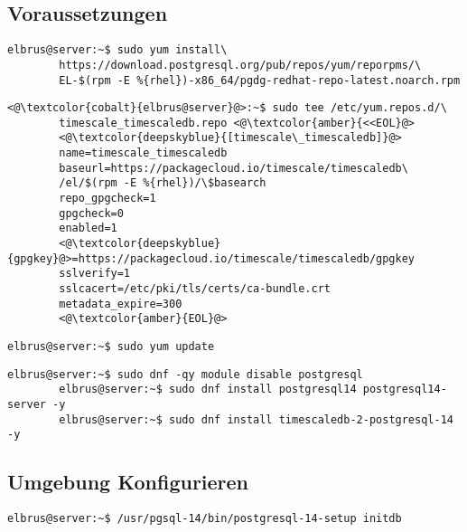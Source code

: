 \documentclass{article}
\begin{document}
	\subsection[dependencies]{Voraussetzungen}
	\lstset{style=commands}
	\begin{lstlisting}[caption={Hinzufügen des PostgreSQL Drittanbieter-Repository, um die neuesten PostgreSQL-Pakete zu erhalten.}]
		elbrus@server:~$ sudo yum install\
		https://download.postgresql.org/pub/repos/yum/reporpms/\
		EL-$(rpm -E %{rhel})-x86_64/pgdg-redhat-repo-latest.noarch.rpm
	\end{lstlisting}

	\lstset{style=commands}
	\begin{lstlisting}[caption={Erstellen und berarbeiten des Timescale repository.},keywords={name, baseurl, repo\_gpgcheck, enabled, sslverify, sslcacert, metadata\_expire}, keywordstyle=\color{deepskyblue}]
		<@\textcolor{cobalt}{elbrus@server}@>:~$ sudo tee /etc/yum.repos.d/\ 
		timescale_timescaledb.repo <@\textcolor{amber}{<<EOL}@>
		<@\textcolor{deepskyblue}{[timescale\_timescaledb]}@>
		name=timescale_timescaledb
		baseurl=https://packagecloud.io/timescale/timescaledb\
		/el/$(rpm -E %{rhel})/\$basearch
		repo_gpgcheck=1
		gpgcheck=0
		enabled=1
		<@\textcolor{deepskyblue}{gpgkey}@>=https://packagecloud.io/timescale/timescaledb/gpgkey
		sslverify=1
		sslcacert=/etc/pki/tls/certs/ca-bundle.crt
		metadata_expire=300
		<@\textcolor{amber}{EOL}@>
	\end{lstlisting}

	\lstset{style=commands}
	\begin{lstlisting}[caption={Updaten der lokalen Package-Liste.}]
		elbrus@server:~$ sudo yum update
	\end{lstlisting}

	\begin{lstlisting}[caption={Installieren von TimescaleDB}]
		elbrus@server:~$ sudo dnf -qy module disable postgresql
		elbrus@server:~$ sudo dnf install postgresql14 postgresql14-server -y
		elbrus@server:~$ sudo dnf install timescaledb-2-postgresql-14 -y
	\end{lstlisting}
	
	\newpage
	\subsection[TimescaleDB konfigurieren]{Umgebung Konfigurieren}
	\begin{lstlisting}[caption={Initialisieren der Datenbank.}]
		elbrus@server:~$ /usr/pgsql-14/bin/postgresql-14-setup initdb
	\end{lstlisting}
	
\end{document}
